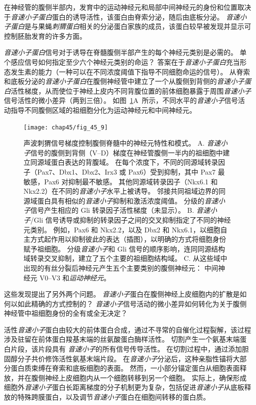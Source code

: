在神经管的腹侧半部内，发育中的运动神经元和局部中间神经元的身份和位置取决于\textit{音速小子蛋白}蛋白的诱导活性，该蛋白由脊索分泌，随后由底板分泌。
\textit{音速小子蛋白}是与果蝇\textit{刺猬蛋白}相关的分泌蛋白家族的成员，该蛋白较早被发现并显示可控制胚胎发育的许多方面。


\textit{音速小子蛋白}信号对于诱导在脊髓腹侧半部产生的每个神经元类别是必需的。
单个感应信号如何指定至少六个神经元类别的命运？
答案在于\textit{音速小子蛋白}充当形态发生素的能力（一种可以在不同浓度阈值下指导不同细胞命运的信号）。
从脊索和底板分泌的\textit{音速小子蛋白}在腹侧神经管中建立了一个从腹侧到背侧的\textit{音速小子蛋白}活性梯度，从而使位于神经上皮内不同背腹位置的前体细胞暴露于周围\textit{音速小子}信号活性的微小差异（两到三倍）。
如图~\ref{fig:45_9}A~所示，不同水平的\textit{音速小子}信号活动指导不同腹侧区域的祖细胞分化为运动神经元和中间神经元。


\begin{figure}[htbp]
	\centering
	\texttt{[image: chap45/fig\_45\_9]}
	\caption{声波刺猬信号梯度控制腹侧脊髓中的神经元特性和模式。
		A. \textit{音速小子}信号的腹侧到背侧（V–D）梯度在神经管腹侧一半内的祖细胞中建立同源域蛋白表达的背腹域。
		在每个浓度下，不同的同源域转录因子（Pax7、Dbx1、Dbx2、Irx3 或 Pax6）受到抑制，其中 Pax7 最敏感，Pax6 对抑制最不敏感。
		其他同源域转录因子（Nkx6.1 和 Nkx2.2）在不同的\textit{音速小子}水平上被诱导。
		邻接共同祖域边界的同源域蛋白具有相似的\textit{音速小子}抑制和激活浓度阈值。
		分级的\textit{音速小子}信号产生相应的 Gli 转录因子活性梯度（未显示）。
		B. \textit{音速小子}/Gli 信号诱导或抑制的转录因子之间的交叉抑制指定了不同的神经元类别。
		例如，Pax6 和 Nkx2.2，以及 Dbx2 和 Nkx6.1，以细胞自主方式起作用以抑制彼此的表达（插图），以明确的方式将细胞身份赋予祖细胞。
		分级\textit{音速小子}和 Gli 信号的顺序影响，连同同源结构域转录交叉抑制，建立了五个主要的祖细胞结构域。
		C. 从这些域中出现的有丝分裂后神经元产生五个主要类别的腹侧神经元：
		中间神经元 V0–V3 和\textit{运动神经元}。}
	\label{fig:45_9}
\end{figure}


这些发现提出了另外两个问题。
\textit{音速小子}蛋白在腹侧神经上皮细胞内的扩散是如何以如此精确的方式控制的？
\textit{音速小子}信号活动的微小差异如何转化为关于腹侧神经管中祖细胞身份的全有或全无决定？


活性\textit{音速小子}蛋白由较大的前体蛋白合成，通过不寻常的自催化过程裂解，该过程涉及驻留在前体蛋白羧基末端的丝氨酸蛋白酶样活性。
切割产生一个氨基末端蛋白片段，该片段具有 \textit{音速小子}的所有信号传导活性。
在切割过程中，通过添加胆固醇分子共价修饰活性氨基末端片段。
在\textit{音速小子}分泌后，这种亲脂性锚将大部分蛋白质束缚在脊索和底板细胞的表面。
然而，一小部分锚定蛋白从细胞表面释放，并在腹侧神经上皮细胞内从一个细胞转移到另一个细胞。
实际上，确保形成细胞外\textit{音速小子}蛋白长距离梯度的分子机制更为复杂，包括促进\textit{音速小子}从底板释放的特殊跨膜蛋白，以及调节\textit{音速小子}蛋白在细胞间转移的蛋白质。


